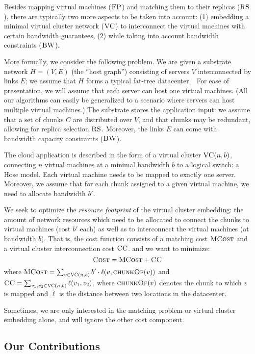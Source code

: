 \documentclass[11pt,a4paper]{scrartcl}
\newcommand{\VC}{\textsc{VC}}
\newcommand{\CC}{\textsc{CC}}
\newcommand{\FP}{\textsc{FP}}
\newcommand{\RS}{\textsc{RS}}
\newcommand{\BW}{\textsc{BW}}
\newcommand{\Cost}{\textsc{Cost}}
\newcommand{\MatchCost}{\textsc{MCost}}
\newcommand{\chunkOf}{\textsc{chunkOf}}
\begin{document}
Besides mapping virtual machines ($\FP$) and matching them to their replicas ($\RS$), there are typically two more 
aspects to be taken into account: (1) embedding a minimal virtual cluster network ($\VC$) to interconnect the virtual machines with certain
bandwidth guarantees, (2) while taking into account bandwidth constraints ($\BW$).

More formally, we consider the following problem. We are given a substrate network $H=(V,E)$ (the ``host graph'') consisting of servers $V$
interconnected by links $E$; we assume that $H$ forms a typical fat-tree datacenter.~\cite{todo}
For ease of presentation, we will assume that each server can host one virtual machines. (All our algorithms can easily be generalized to 
a scenario where servers can host multiple virtual machines.)
The substrate stores the application input: we assume that a set of chunks $C$ are distributed over $V$, and that chunks may be redundant,
allowing for replica selection $\RS$. Moreover, the links $E$ can come with bandwidth capacity constraints ($\BW$).

The cloud application is described in the form of a virtual cluster $\VC(n,b)$, connecting $n$ virtual machines at a minimal bandwidth $b$
to a logical switch: a Hose model. Each virtual machine needs to be mapped to exactly one server. Moreover, we assume that for each chunk
assigned to a given virtual machine, we need to allocate bandwidth $b'$.

We seek to optimize the \emph{resource footprint} of the virtual cluster embedding: the amount of network resources which need to be allocated
to connect the chunks to virtual machines (cost $b'$ each) as well as to interconnect the virtual machines (at bandwidth $b$). That is,
the cost function consists of a matching cost $\MatchCost$ and a virtual cluster interconnection cost $\CC$.
and we want to minimize:
$$
\Cost = \MatchCost + \CC
$$
\noindent where $\MatchCost = \sum_{v\in \VC(n,b)} b'\cdot \ell(v,\chunkOf(v))$ and 
$\CC = \sum_{v_1,v_2\in \VC(n,b)} \ell(v_1,v_2)$, where $\chunkOf(v)$ denotes
the chunk to which $v$ is mapped and $\ell$ is the distance
between two locations in the datacenter.

Sometimes, we are only interested in the matching problem or virtual cluster embedding alone,
and will ignore the other cost component.


 

\subsection{Our Contributions}
\end{document}
